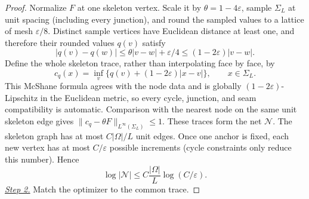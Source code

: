 \documentclass{smfart}
\theoremstyle{definition}
\newcommand{\1}{\mathbf 1}
\begin{document}
\begin{proof}
Normalize $F$ at one skeleton vertex.  Scale it by
$\theta=1-4\varepsilon$, sample $\Sigma_ L$ at unit spacing (including
every junction), and round the sampled values to a lattice of mesh
$\varepsilon/8$.  Distinct sample vertices have Euclidean distance at
least one, and therefore their rounded values $q(v)$ satisfy
\begin{equation*}
|q(v)-q(w)|\leq\theta|v-w|+\varepsilon/4
\leq(1-2\varepsilon)|v-w|.
\end{equation*}
Define the whole skeleton trace, rather than interpolating face by face, by
\begin{equation}
c_ q(x)=\inf_ v\{q(v)+(1-2\varepsilon)|x-v|\},
\qquad x\in\Sigma_ L.
\tag{20a}
\end{equation}
This McShane formula agrees with the node data and is globally
$(1-2\varepsilon)$-Lipschitz in the Euclidean metric, so every cycle,
junction, and seam compatibility is automatic.  Comparison with the
nearest node on the same unit skeleton edge gives
$\|c_ q-\theta F\|_ {L^\infty(\Sigma_ L)}\leq1$.
These traces form the net $\mathcal N$.
The skeleton graph has at most $C|\Omega|/L$ unit edges.  Once one
anchor is fixed, each new vertex has at most $C/\varepsilon$ possible
increments (cycle constraints only reduce this number).  Hence
\begin{equation}
\log|\mathcal N|
\leq C\frac{|\Omega|}{L}\log(C/\varepsilon).
\tag{21}
\end{equation}
\smallskip\noindent
\underline{\textit{Step 2.}} Match the optimizer to the common trace.


\end{proof}
\end{document}
